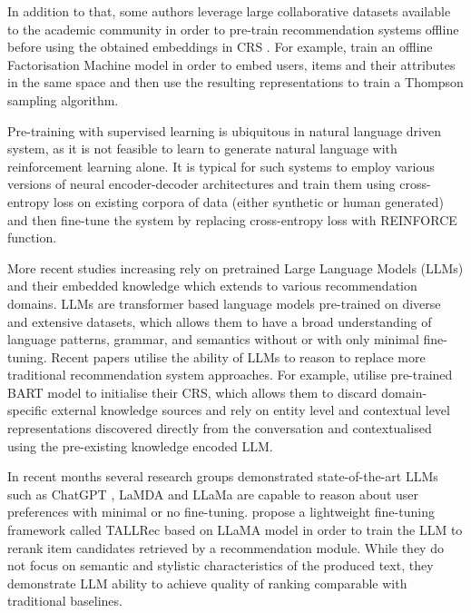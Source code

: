 In addition to that, some authors leverage large collaborative datasets available to the academic community in order to pre-train recommendation systems offline before using the obtained embeddings in CRS \citep{lei2020estimation,  li2021seamlessly}. For example, \citep{li2021seamlessly} train an offline Factorisation Machine model in order to embed users, items and their attributes in the same space and then use the resulting representations to train a Thompson sampling algorithm.

Pre-training with supervised learning is ubiquitous in natural language driven system, as it is not feasible to learn to generate natural language with reinforcement learning alone. It is typical for such systems to employ various versions of neural encoder-decoder architectures and train them using cross-entropy loss on existing corpora of data (either synthetic or human generated) and then fine-tune the system by replacing cross-entropy loss with REINFORCE \citep{greco2017converse, kang2019recommendation} function.

More recent studies increasing rely on pretrained Large Language Models (LLMs) and their embedded knowledge which extends to various recommendation domains. LLMs are transformer based language models pre-trained on diverse and extensive datasets, which allows them to have a broad understanding of language patterns, grammar, and semantics without or with only minimal fine-tuning. Recent papers utilise the ability of LLMs to reason to replace more traditional recommendation system approaches. For example, \cite{wang2022improving} utilise pre-trained BART model to initialise their CRS, which allows them to discard domain-specific external knowledge sources and rely on entity level and contextual level representations discovered directly from the conversation and contextualised using the pre-existing knowledge encoded LLM.

In recent months several research groups demonstrated state-of-the-art LLMs such as ChatGPT \citep{gao2023chat}, LaMDA \citep{friedman2023leveraging} and LLaMa \citep{bao2023tallrec} are capable to reason about user preferences with minimal or no fine-tuning. \cite{bao2023tallrec} propose a lightweight fine-tuning framework called TALLRec based on  LLaMA model in order to train the LLM to rerank item candidates retrieved by a recommendation module. While they do not focus on semantic and stylistic characteristics of the produced text, they demonstrate LLM ability to achieve quality of ranking comparable with traditional baselines.

